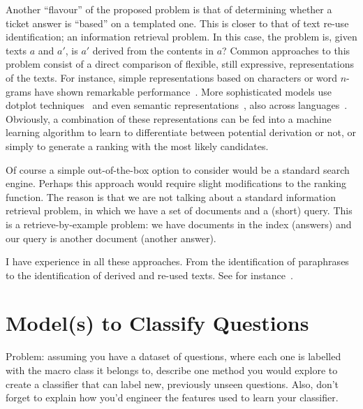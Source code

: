 \documentclass[11pt]{article}
\begin{document}
Another ``flavour'' of the proposed problem is that of determining whether a 
ticket answer is ``based'' on a templated one. This is closer to that of 
text re-use identification; an information retrieval problem.  
In this case, the problem is, given texts $a$ and $a'$, is $a'$ derived from the 
contents in $a$? Common approaches to this problem consist of a direct 
comparison of flexible, still expressive, representations of the texts. For 
instance, simple representations based on characters or word $n$-grams have 
shown remarkable performance~\cite{Lyon:04}. More sophisticated models use 
dotplot techniques~\cite{Basile:2009} and even semantic 
representations~\cite{Gabrilovich:07}, also across languages~\cite{Potthast:11}. 
Obviously, a combination of these representations can be fed into a machine 
learning algorithm to learn to differentiate between potential derivation or 
not, or simply to generate a ranking with the most likely candidates.%

Of course a simple out-of-the-box option to consider would be a standard search 
engine. Perhaps this approach would require slight modifications to the ranking 
function. The reason is that we are not talking about a standard information 
retrieval problem, in which we have a set of documents and a (short) query. This 
is a retrieve-by-example problem: we have documents in the index (answers) and 
our query is another document (another answer). 
\medskip

I have experience in all these approaches. From the identification of 
paraphrases to the identification of derived and re-used texts. See for 
instance~\cite{BarronPhd:12}.

\section{Model(s) to Classify Questions}

Problem: assuming you have a dataset of questions, where each one is labelled 
with the macro class it belongs to, describe one method you would explore to 
create a classifier that can label new, previously unseen questions. Also, don't 
forget to explain how you'd engineer the features used to learn your classifier.
\medskip
\end{document}
